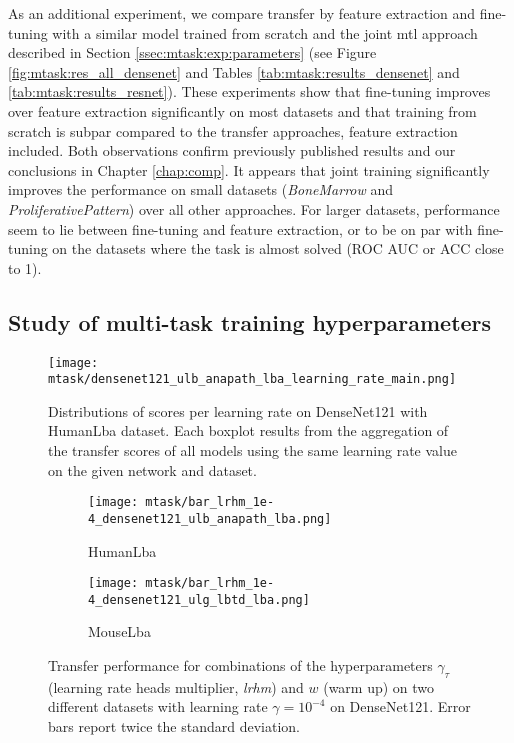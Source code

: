 As an additional experiment, we compare transfer by feature extraction and fine-tuning with a similar model trained from scratch and the joint \acrshort{mtl} approach described in Section \ref{ssec:mtask:exp:parameters} (see Figure \ref{fig:mtask:res_all_densenet} and Tables \ref{tab:mtask:results_densenet} and
\ref{tab:mtask:results_resnet}). These experiments show that fine-tuning improves over feature extraction significantly on most datasets and that training from scratch is subpar compared to the transfer approaches, feature extraction included. Both observations confirm previously published results \cite{ponzio2019dealing, tajbakhsh2016convolutional,shin2016deep} and our conclusions in Chapter \ref{chap:comp}. It appears that joint training significantly improves the performance on small datasets (\textit{BoneMarrow} and \textit{ProliferativePattern}) over all other approaches. For larger datasets, performance seem to lie between fine-tuning and feature extraction, or to be on par with fine-tuning on the datasets where the task is almost solved (ROC AUC or ACC close to 1). 

\subsection{Study of multi-task training hyperparameters}
\label{ssec:mtask:hyperparameters}

\begin{figure}[t]
    \centering
    \texttt{[image: mtask/densenet121\_ulb\_anapath\_lba\_learning\_rate\_main.png]}
    \caption{Distributions of scores per learning rate on DenseNet121 with HumanLba dataset. Each boxplot results from the aggregation of the transfer scores of all models using the same learning rate value on the given network and dataset.}
    \label{fig:mtask:lr_effect}
\end{figure}

\begin{figure}[t]
    \centering
    \begin{subfigure}[t]{0.70\textwidth}
        \centering
        \texttt{[image: mtask/bar\_lrhm\_1e-4\_densenet121\_ulb\_anapath\_lba.png]}
        \caption{HumanLba}
    \end{subfigure}    
    \begin{subfigure}[t]{0.70\textwidth}
        \centering
        \texttt{[image: mtask/bar\_lrhm\_1e-4\_densenet121\_ulg\_lbtd\_lba.png]}
        \caption{MouseLba}
    \end{subfigure}    
    \caption{Transfer performance for combinations of the hyperparameters $\gamma_\tau$ (learning rate heads multiplier, \textit{lrhm}) and $w$ (warm up) on two different datasets with learning rate $\gamma = 10^{-4}$ on DenseNet121. Error bars report twice the standard deviation.}
    \label{fig:mtask:hyper_other_effect}
\end{figure}

